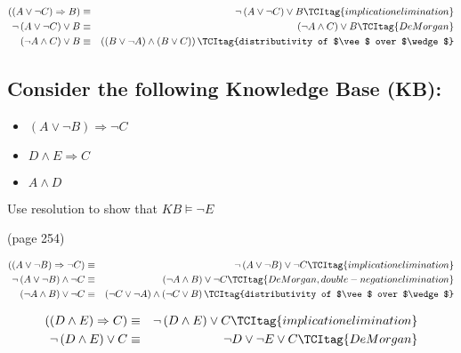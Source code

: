 \documentclass{article}
\begin{document}
\begin{eqnarray}
\left( \left( A\vee \lnot C\right) \Rightarrow B\right) &\equiv &\lnot
\left( A\vee \lnot C\right) \vee B  \TCItag{implication elimination} \\
\lnot \left( A\vee \lnot C\right) \vee B &\equiv &\left( \lnot A\wedge
C\right) \vee B  \TCItag{De Morgan} \\
\left( \lnot A\wedge C\right) \vee B &\equiv &\left( \left( B\vee \lnot
A\right) \wedge \left( B\vee C\right) \right)  \TCItag{distributivity
of
$\vee $ over $\wedge $}
\end{eqnarray}

\subsection{Consider the following Knowledge Base (KB):}

\begin{itemize}
\item $\left( A\vee \lnot B\right) \Rightarrow \lnot C$

\item $D\wedge E\Rightarrow C$

\item $A\wedge D$
\end{itemize}

Use resolution to show that $KB\models \lnot E$

(page 254)

\begin{eqnarray}
\left( \left( A\vee \lnot B\right) \Rightarrow \lnot C\right)  &\equiv
&\lnot \left( A\vee \lnot B\right) \vee \lnot C  \TCItag{implication
elimination} \\
\lnot \left( A\vee \lnot B\right) \wedge \lnot C &\equiv &\left( \lnot
A\wedge B\right) \vee \lnot C  \TCItag{De Morgan, double-negation
elimination} \\
\left( \lnot A\wedge B\right) \vee \lnot C &\equiv &\left( \lnot C\vee \lnot
A\right) \wedge \left( \lnot C\vee B\right)   \TCItag{distributivity of
$\vee $ over $\wedge $}
\end{eqnarray}

\bigskip 

\begin{eqnarray}
\left( \left( D\wedge E\right) \Rightarrow C\right)  &\equiv &\lnot \left(
D\wedge E\right) \vee C  \TCItag{implication elimination} \\
\lnot \left( D\wedge E\right) \vee C &\equiv &\lnot D\vee \lnot E\vee C 
\TCItag{De Morgan}
\end{eqnarray}
\end{document}
